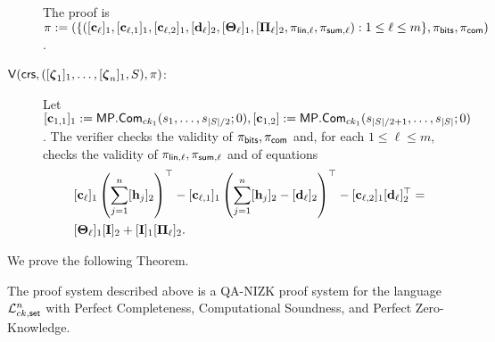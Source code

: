 \begin{description}
The proof is $\pi:=(\{([\mathbf{c}_\ell]_1,[\mathbf{c}_{\ell,1}]_1,[\mathbf{c}_{\ell,2}]_1,[\mathbf{d}_\ell]_2,[\mathbf{{\Theta}}_\ell]_1,[\mathbf{{\Pi}}_\ell]_2,\pi_{\mathsf{lin},\ell},\pi_{\mathsf{sum},\ell}):1\leq\ell\leq m\},\pi_{\mathsf{bits}},\pi_{\mathsf{com}})$.

\item[{$\mathsf{V}(\mathsf{crs},([{\boldsymbol \zeta}_1]_1, \ldots, [{\boldsymbol \zeta}_n]_1,S),\pi)$}:]
Let $[\mathbf{c}_{1,1}]_1:=\mathsf{MP}.\mathsf{Com}_{ck_1}(s_1,\ldots,s_{|S|/2};0),[\mathbf{c}_{1,2}]:=\mathsf{MP}.\mathsf{Com}_{ck_1}(s_{|S|/2+1},\ldots,s_{|S|};0)$. The verifier checks the validity of $\pi_{\mathsf{bits}},\pi_{\mathsf{com}}$ 
and, for each $1\leq \ell\leq m$, checks the validity of $\pi_{\mathsf{lin},\ell},\pi_{\mathsf{sum},\ell}$ and of equations
\begin{align}
&[\mathbf{c}_\ell]_1\left(\sum_{j=1}^n [\mathbf{h}_j]_2\right)^\top-
[\mathbf{c}_{\ell,1}]_1\left(\sum_{j=1}^n[\mathbf{h}_j]_2-[\mathbf{d}_\ell]_2\right)^\top-
[\mathbf{c}_{\ell,2}]_1[\mathbf{d}_\ell]_2^\top = \nonumber\\
&[\mathbf{{\Theta}}_\ell]_1[\mathbf{{I}}]_2+[\mathbf{{I}}]_1[\mathbf{{\Pi}}_\ell]_2.  \label{eq-alog-5}
\end{align}

\end{description}

We prove the following Theorem.

\begin{theorem} \label{theo:bits}
The proof system described above is a QA-NIZK proof system for the language $\mathcal{L}_{ck,\mathsf{set}}^n$
 with Perfect Completeness, Computational Soundness, and Perfect Zero-Knowledge.
\end{theorem}	

